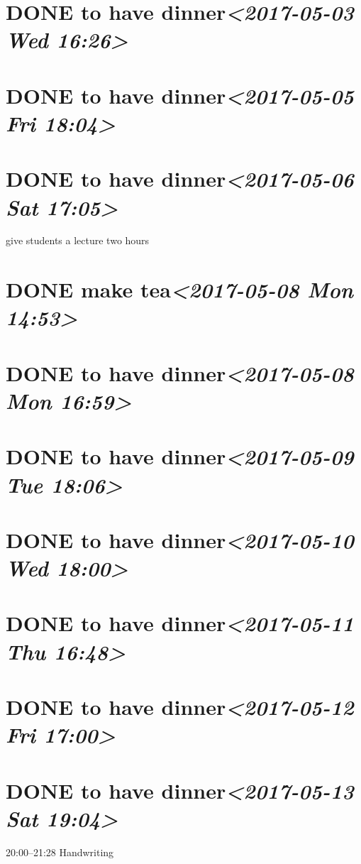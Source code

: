 \documentclass[cyan]{elegantnote}
\begin{document}
\section{{\bfseries\sffamily DONE} to have dinner\textit{<2017-05-03 Wed 16:26>}}
\label{sec:orgc72eb38}
\section{{\bfseries\sffamily DONE} to have dinner\textit{<2017-05-05 Fri 18:04>}}
\label{sec:org182bc97}
\section{{\bfseries\sffamily DONE} to have dinner\textit{<2017-05-06 Sat 17:05>}}
\label{sec:org296f82a}
give students a  lecture two hours
\section{{\bfseries\sffamily DONE} make tea\textit{<2017-05-08 Mon 14:53>}}
\label{sec:org1bdc1cf}
\section{{\bfseries\sffamily DONE} to have dinner\textit{<2017-05-08 Mon 16:59>}}
\label{sec:orgd06abba}
\section{{\bfseries\sffamily DONE} to have dinner\textit{<2017-05-09 Tue 18:06>}}
\label{sec:org6d6cd33}
\section{{\bfseries\sffamily DONE} to have dinner\textit{<2017-05-10 Wed 18:00>}}
\label{sec:org3f56620}
\section{{\bfseries\sffamily DONE} to have dinner\textit{<2017-05-11 Thu 16:48>}}
\label{sec:org9e0b878}
\section{{\bfseries\sffamily DONE} to have dinner\textit{<2017-05-12 Fri 17:00>}}
\label{sec:org7519190}
\section{{\bfseries\sffamily DONE} to have dinner\textit{<2017-05-13 Sat 19:04>}}
\label{sec:org3695c50}
20:00--21:28 Handwriting
\end{document}
